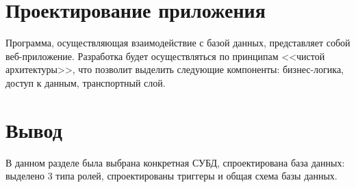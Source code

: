 \section{Проектирование приложения}

Программа, осуществляющая взаимодействие с базой данных, представляет собой веб-приложение. Разработка будет осуществляться по принципам <<чистой архитектуры>>, что позволит выделить следующие компоненты: бизнес-логика, доступ к данным, транспортный слой.

%

\section{Вывод}

В данном разделе была выбрана конкретная СУБД, спроектирована база данных: выделено 3 типа ролей, спроектированы триггеры и общая схема базы данных.
%
%
%
%
%
%
